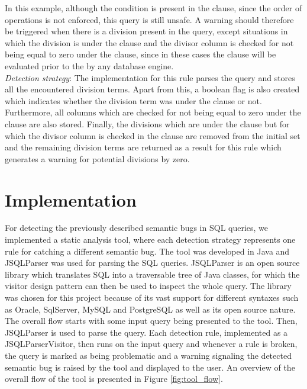 In this example, although the condition  is present in the  clause, since the order of operations is not enforced, this query is still unsafe. A warning should therefore be triggered when there is a division present in the query, except situations in which the division is under the  clause and the divisor column is checked for not being equal to zero under the  clause, since in these cases the  clause will be evaluated prior to the  by any database engine.\\

\noindent \emph{Detection strategy}: The implementation for this rule parses the query and stores all the encountered division terms. Apart from this, a boolean flag is also created which indicates whether the division term was under the  clause or not. Furthermore, all columns which are checked for not being equal to zero under the  clause are also stored. Finally, the divisions which are under the  clause but for which the divisor column is checked in the  clause are removed from the initial set and the remaining division terms are returned as a result for this rule which generates a warning for potential divisions by zero.

\section{Implementation}
\label{section:implementation}

For detecting the previously described semantic bugs in SQL queries, we implemented a static analysis tool, where each detection strategy represents one rule for catching a different semantic bug. The tool was developed in Java and JSQLParser was used for parsing the SQL queries. JSQLParser is an open source library which translates SQL into a traversable tree of Java classes, for which the visitor design pattern can then be used to inspect the whole query. The library was chosen for this project because of its vast support for different syntaxes such as Oracle, SqlServer, MySQL and PostgreSQL as well as its open source nature.
The overall flow starts with some input query being presented to the tool. Then, JSQLParser is used to parse the query. Each detection rule, implemented as a JSQLParserVisitor, then runs on the input query and whenever a rule is broken, the query is marked as being problematic and a warning signaling the detected semantic bug is raised by the tool and displayed to the user. An overview of the overall flow of the tool is presented in Figure \ref{fig:tool_flow}.

